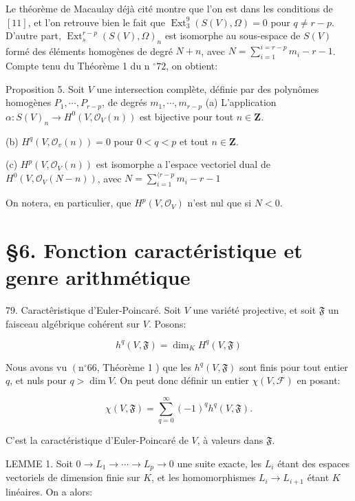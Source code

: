 Le théorème de Macaulay déjà cité montre que l'on est dans les conditions de $[11]$, et l'on retrouve bien le fait que $\operatorname{Ext}_{3}^{9}(S(V), \Omega)=0$ pour $q \neq r-p$. D'autre part, $\operatorname{Ext}_{s}^{r-p}(S(V), \Omega)_{n}$ est isomorphe au sous-espace de $S(V)$ formé des éléments homogènes de degré $N+n$, avec $N=\sum_{i=1}^{i=r-p} m_{i}-r-1$. Compte tenu du Théorème 1 du n $^{\circ} 72$, on obtient:

Proposition 5. Soit $V$ une intersection complète, définie par des polynômes homogènes $P_{1}, \cdots, P_{r-p}$, de degrés $m_{1}, \cdots, m_{r-p}$ (a) L'application $\alpha: S(V)_{n} \rightarrow H^{0}\left(V, \mathcal{O}_{V}(n)\right)$ est bijective pour tout $n \in \mathbf{Z}$.

(b) $H^{q}\left(V, \mathcal{O}_{v}(n)\right)=0$ pour $0<q<p$ et tout $n \in \mathbf{Z}$.

(c) $H^{p}\left(V, \mathcal{O}_{V}(n)\right)$ est isomorphe a l'espace vectoriel dual de $H^{0}\left(V, \mathcal{O}_{V}(N-n)\right)$, avec $N=\sum_{i=1}^{\langle r-p} m_{i}-r-1$

On notera, en particulier, que $H^{p}\left(V, \mathcal{O}_{V}\right)$ n'est nul que si $N<0$.

\section{§6. Fonction caractéristique et genre arithmétique}

79. Caractêristique d'Euler-Poincaré. Soit $V$ une variété projective, et soit $\mathfrak{F}$ un faisceau algébrique cohérent sur $V$. Posons:

$$
h^{q}(V, \mathfrak{F})=\operatorname{dim}_{K} H^{q}(V, \mathfrak{F})
$$

Nous avons vu $\left(\mathrm{n}^{\circ} 66\right.$, Théorème 1 ) que les $h^{q}(V, \mathfrak{F})$ sont finis pour tout entier $q$, et nuls pour $q>\operatorname{dim} V .$ On peut donc définir un entier $\chi(V, \mathcal{F})$ en posant:

$$
\chi(V, \mathfrak{F})=\sum_{q=0}^{\infty}(-1)^{q} h^{q}(V, \mathfrak{F}) .
$$

C'est la caractéristique d'Euler-Poincaré de $V$, à valeurs dans $\mathfrak{F}$.

LEMME 1. Soit $0 \rightarrow L_{1} \rightarrow \cdots \rightarrow L_{p} \rightarrow 0$ une suite exacte, les $L_{i}$ étant des espaces vectoriels de dimension finie sur $K$, et les homomorphismes $L_{i} \rightarrow L_{i+1}$ étant $K$ linéaires. On a alors:

